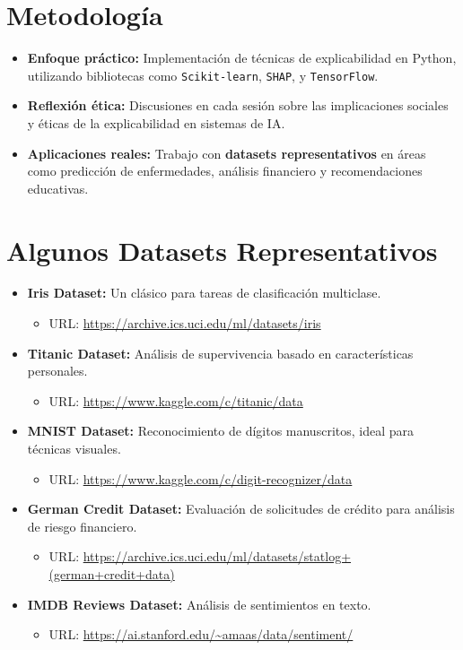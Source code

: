 \section*{Metodología}
\begin{itemize}
    \item \textbf{Enfoque práctico:} Implementación de técnicas de explicabilidad en Python, utilizando bibliotecas como \texttt{Scikit-learn}, \texttt{SHAP}, y \texttt{TensorFlow}.
    \item \textbf{Reflexión ética:} Discusiones en cada sesión sobre las implicaciones sociales y éticas de la explicabilidad en sistemas de IA.
    \item \textbf{Aplicaciones reales:} Trabajo con \textbf{datasets representativos} en áreas como predicción de enfermedades, análisis financiero y recomendaciones educativas.
\end{itemize}

\section*{Algunos Datasets Representativos}
\begin{itemize}
    \item \textbf{Iris Dataset:} Un clásico para tareas de clasificación multiclase.
        \begin{itemize}
            \item URL: \url{https://archive.ics.uci.edu/ml/datasets/iris}
        \end{itemize}
    \item \textbf{Titanic Dataset:} Análisis de supervivencia basado en características personales.
        \begin{itemize}
            \item URL: \url{https://www.kaggle.com/c/titanic/data}
        \end{itemize}
    \item \textbf{MNIST Dataset:} Reconocimiento de dígitos manuscritos, ideal para técnicas visuales.
        \begin{itemize}
            \item URL: \url{https://www.kaggle.com/c/digit-recognizer/data}
        \end{itemize}
    \item \textbf{German Credit Dataset:} Evaluación de solicitudes de crédito para análisis de riesgo financiero.
        \begin{itemize}
            \item URL: \url{https://archive.ics.uci.edu/ml/datasets/statlog+(german+credit+data)}
        \end{itemize}
    \item \textbf{IMDB Reviews Dataset:} Análisis de sentimientos en texto.
        \begin{itemize}
            \item URL: \url{https://ai.stanford.edu/~amaas/data/sentiment/}
        \end{itemize}
\end{itemize}

